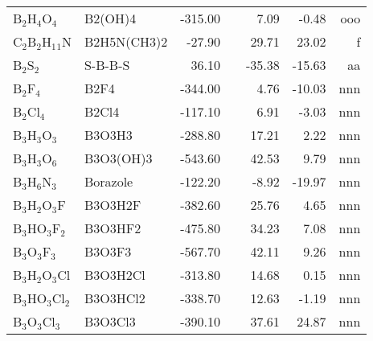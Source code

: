 \begin{table}
\begin{center}
\begin{tabular}{llrrrrr}
 B$_2$H$_4$O$_4$      & B2(OH)4                               &  -315.00    &  &     7.09  &    -0.48  &    ooo\\
 C$_2$B$_2$H$_1$$_1$N    & B2H5N(CH3)2                           &   -27.90    &  &    29.71  &    23.02  &      f\\
 B$_2$S$_2$        & S-B-B-S                               &    36.10    &  &   -35.38  &   -15.63  &     aa\\
 B$_2$F$_4$        & B2F4                                  &  -344.00    &  &     4.76  &   -10.03  &    nnn\\
 B$_2$Cl$_4$       & B2Cl4                                 &  -117.10    &  &     6.91  &    -3.03  &    nnn\\
 B$_3$H$_3$O$_3$      & B3O3H3                                &  -288.80    &  &    17.21  &     2.22  &    nnn\\
 B$_3$H$_3$O$_6$      & B3O3(OH)3                             &  -543.60    &  &    42.53  &     9.79  &    nnn\\
 B$_3$H$_6$N$_3$      & Borazole                              &  -122.20    &  &    -8.92  &   -19.97  &    nnn\\
 B$_3$H$_2$O$_3$F     & B3O3H2F                               &  -382.60    &  &    25.76  &     4.65  &    nnn\\
 B$_3$HO$_3$F$_2$     & B3O3HF2                               &  -475.80    &  &    34.23  &     7.08  &    nnn\\
 B$_3$O$_3$F$_3$      & B3O3F3                                &  -567.70    &  &    42.11  &     9.26  &    nnn\\
 B$_3$H$_2$O$_3$Cl    & B3O3H2Cl                              &  -313.80    &  &    14.68  &     0.15  &    nnn\\
 B$_3$HO$_3$Cl$_2$    & B3O3HCl2                              &  -338.70    &  &    12.63  &    -1.19  &    nnn\\
 B$_3$O$_3$Cl$_3$     & B3O3Cl3                               &  -390.10    &  &    37.61  &    24.87  &    nnn\\
\hline
\end{tabular}
\end{center}
\end{table}
\clearpage

